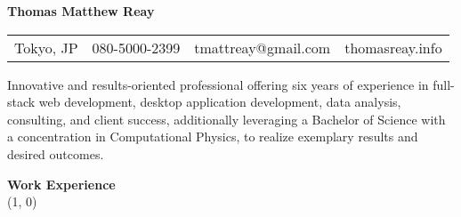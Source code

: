 \documentclass{article}
\newcommand{\heading}[1]{
	\vspace{2em}
	\textbf{\large #1} \\
	\line(1, 0){\textwidth}
	\vspace{-0.5em}
}
\begin{document}
\textbf{\huge Thomas Matthew Reay}

\vspace{1em}

\begin{tabular*}{\textwidth}{l|l|l|l}
	\hline
	Tokyo, JP & 080-5000-2399 & tmattreay@gmail.com & thomasreay.info
	\rule{0em}{1.25em} \\
\end{tabular*}

\vspace{1em}

Innovative and results-oriented professional offering six years of experience
in full-stack web development, desktop application development, data analysis,
consulting, and client success, additionally leveraging a Bachelor of Science
with a concentration in Computational Physics, to realize exemplary results and
desired outcomes.

\heading{Work Experience}
\end{document}
